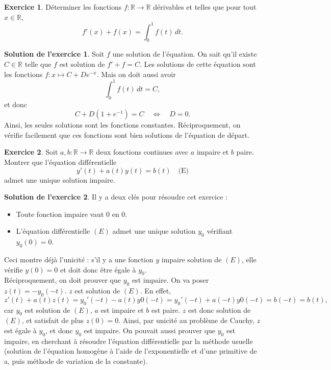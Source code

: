 \documentclass[a4paper, 11pt,openany]{article}%
\theoremstyle{plain}
\theoremstyle{definition}
\newtheorem{exo}{Exercice}
\newtheorem{sol}{Solution de l'exercice}
\theoremstyle{remark}
\newcommand{\R}{\mathbb{R}}
\begin{document}
\begin{exo}
Déterminer les fonctions $f:\R \to \R$ dérivables et telles que pour tout $x \in \R$, 
\[ f'(x)+f(x)= \int_0^1 f(t) \, dt.\]
\end{exo}

\begin{sol}
Soit $f$ une solution de l'équation. On sait qu'il existe $C \in \R$ telle que $f$ est solution de $f'+f=C$. Les solutions de cette équation sont les fonctions $f:x \mapsto C+De^{-x}$. Mais on doit aussi avoir 
\[ \int_0^1 f(t) \, dt = C,\]
et donc \[ C+D(1+e^{-1})=C \quad \Leftrightarrow \quad D=0.\]
Ainsi, les seules solutions sont les fonctions constantes. Réciproquement, on vérifie facilement que ces fonctions sont bien solutions de l'équation de départ. 
\end{sol}
   



\begin{exo}
Soit $a,b:\R \to \R$ deux fonctions continues avec $a$ impaire et $b$ paire. Montrer que l'équation différentielle 
\[  y'(t)+a(t)y(t)=b(t) \quad \text{(E)}\] admet une unique solution impaire.
\end{exo}

\begin{sol}
Il y a deux clés pour résoudre cet exercice :
\begin{itemize}
\item Toute fonction impaire vaut 0 en 0.
\item L'équation différentielle $(E)$
admet une unique solution $y_0$ vérifiant $y_0(0)=0$.
\end{itemize}
Ceci montre déjà l'unicité : s'il y a une fonction $y$ impaire solution de $(E)$, elle vérifie $y(0)=0$ et doit donc être égale à $y_0$.\\
Réciproquement, on doit prouver que $y_0$ est impaire. On va poser $z(t)=-y_0(-t)$. $z$ est solution de $(E)$. En effet, 
\[ z'(t)+a(t)z(t)=y_0'(-t)-a(t)y0(-t)=y_0'(-t)+a(-t)y0(-t)=b(-t)=b(t),\]
car $y_0$ est solution de $(E)$, $a$ est impaire et $b$ est paire. $z$ est donc solution de $(E)$, et satisfait de plus $z(0)=0$. Ainsi, par unicité au problème de Cauchy, $z$ est égale à $y_0$, et donc $y_0$ est impaire.
On pouvait aussi prouver que $y_0$ est impaire, en cherchant à résoudre l'équation différentielle par la méthode usuelle (solution de l'équation homogène à l'aide de l'exponentielle et d'une primitive de a, puis méthode de variation de la constante).
\end{sol}
\end{document}

